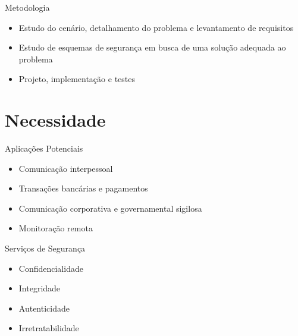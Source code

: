 \documentclass[notes,blue,mathserif]{beamer}
\begin{document}
\begin{frame}{Metodologia}
\begin{itemize}[<+->]
\item Estudo do cen\'{a}rio, detalhamento do problema e levantamento de requisitos
\item Estudo de esquemas de seguran\c{c}a em busca de uma solu\c{c}\~{a}o adequada ao problema
\item Projeto, implementa\c{c}\~{a}o e testes
\end{itemize}
\end{frame}

\section{Necessidade}


\begin{frame}{Aplica\c{c}\~{o}es Potenciais}
\begin{itemize}[<+->]
\item Comunica\c{c}\~{a}o interpessoal
\item Transa\c{c}\~{o}es banc\'{a}rias e pagamentos
\item Comunica\c{c}\~{a}o corporativa e governamental sigilosa
\item Monitora\c{c}\~{a}o remota
\end{itemize}
\end{frame}


\begin{frame}{Servi\c{c}os de Seguran\c{c}a}
\begin{itemize}[<+->]
\item Confidencialidade
\item Integridade
\item Autenticidade
\item Irretratabilidade
\end{itemize}
\end{frame}

\end{document}
